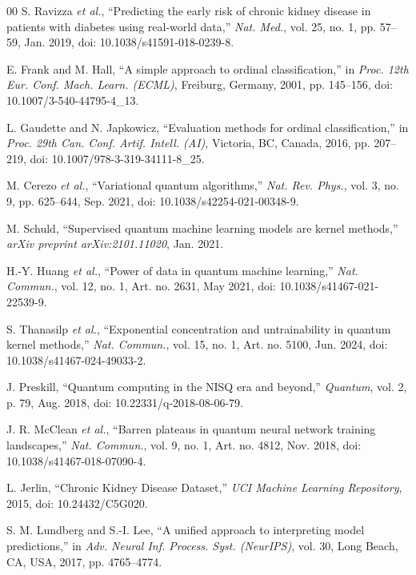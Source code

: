 \documentclass[conference]{IEEEtran}
\begin{document}
\begin{thebibliography}{00}
S. Ravizza \emph{et al.}, ``Predicting the early risk of chronic kidney disease in patients with diabetes using real-world data,'' \emph{Nat. Med.}, vol. 25, no. 1, pp. 57--59, Jan. 2019, doi: 10.1038/s41591-018-0239-8.

E. Frank and M. Hall, ``A simple approach to ordinal classification,'' in \emph{Proc. 12th Eur. Conf. Mach. Learn. (ECML)}, Freiburg, Germany, 2001, pp. 145--156, doi: 10.1007/3-540-44795-4\_13.

L. Gaudette and N. Japkowicz, ``Evaluation methods for ordinal classification,'' in \emph{Proc. 29th Can. Conf. Artif. Intell. (AI)}, Victoria, BC, Canada, 2016, pp. 207--219, doi: 10.1007/978-3-319-34111-8\_25.

M. Cerezo \emph{et al.}, ``Variational quantum algorithms,'' \emph{Nat. Rev. Phys.}, vol. 3, no. 9, pp. 625--644, Sep. 2021, doi: 10.1038/s42254-021-00348-9.

M. Schuld, ``Supervised quantum machine learning models are kernel methods,'' \emph{arXiv preprint arXiv:2101.11020}, Jan. 2021.

H.-Y. Huang \emph{et al.}, ``Power of data in quantum machine learning,'' \emph{Nat. Commun.}, vol. 12, no. 1, Art. no. 2631, May 2021, doi: 10.1038/s41467-021-22539-9.

S. Thanasilp \emph{et al.}, ``Exponential concentration and untrainability in quantum kernel methods,'' \emph{Nat. Commun.}, vol. 15, no. 1, Art. no. 5100, Jun. 2024, doi: 10.1038/s41467-024-49033-2.

J. Preskill, ``Quantum computing in the NISQ era and beyond,'' \emph{Quantum}, vol. 2, p. 79, Aug. 2018, doi: 10.22331/q-2018-08-06-79.

J. R. McClean \emph{et al.}, ``Barren plateaus in quantum neural network training landscapes,'' \emph{Nat. Commun.}, vol. 9, no. 1, Art. no. 4812, Nov. 2018, doi: 10.1038/s41467-018-07090-4.

L. Jerlin, ``Chronic Kidney Disease Dataset,'' \emph{UCI Machine Learning Repository}, 2015, doi: 10.24432/C5G020.

S. M. Lundberg and S.-I. Lee, ``A unified approach to interpreting model predictions,'' in \emph{Adv. Neural Inf. Process. Syst. (NeurIPS)}, vol. 30, Long Beach, CA, USA, 2017, pp. 4765--4774.


\end{thebibliography}
\end{document}
